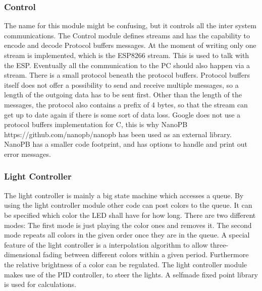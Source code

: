 \subsubsection{Control}
The name for this module might be confusing, but it controls all the inter
system communications. The Control module defines streams and has the capability
to encode and decode Protocol buffers messages. At the moment of writing only
one stream is implemented, which is the ESP8266 stream. This is used to talk
with the ESP. Eventually all the communication to the PC should also happen via
a stream. There is a small protocol beneath the protocol buffers. Protocol
buffers itself does not offer a possibility to send and receive multiple
messages, so a length of the outgoing data has to be sent first. Other than the
length of the messages, the protocol also contains a prefix of 4 bytes, so that
the stream can get up to date again if there is some sort of data loss. Google
does not use a protocol buffers implementation for C, this is why NanoPB
https://github.com/nanopb/nanopb has been used as an external library. NanoPB
has a smaller code footprint, and has options to handle and print out error
messages.

\subsubsection{Light Controller}
The light controller is mainly a big state machine which accesses a queue. By
using the light controller module other code can post colors to the queue. It
can be specified which color the LED shall have for how long. There are two
different modes: The first mode is just playing the color ones and removes it.
The second mode repeats all colors in the given order once they are in the
queue. A special feature of the light controller is a interpolation algorithm to
allow three-dimensional fading between different colors within a given period.
Furthermore the relative brightness of a color can be regulated. The light
controller module makes use of the PID controller, to steer the lights. A
selfmade fixed point library is used for calculations.


